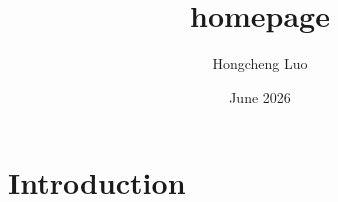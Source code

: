 \documentclass{article}
\title{homepage}
\author{Hongcheng Luo}
\date{June 2026}
\begin{document}
\maketitle

\section{Introduction}
\end{document}

